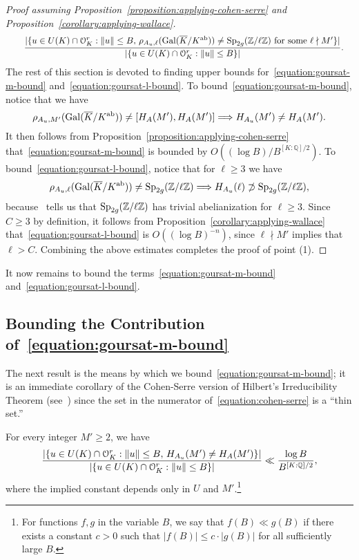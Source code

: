 \begin{proof}[Proof assuming Proposition~\ref{proposition:applying-cohen-serre} and Proposition~\ref{corollary:applying-wallace}]
\begin{align}
			& \qquad \frac{|\{ u \in U(K) \cap \mathcal O_K^r : \|u \| \leq B,\, \rho_{A_u, \ell}(\Gal(\overline K/K^{\ab})) \neq \Sp_{2g}(\mathbb Z/\ell \mathbb Z) \text{ for some } \ell \nmid M' \}|}{|\{ u \in U(K) \cap \mathcal O_K^r : \|u \| \leq B \} |} \raisetag{-0.6cm}{\label{equation:goursat-l-bound}}.
\end{align}
The rest of this section is devoted to finding upper bounds for~\eqref{equation:goursat-m-bound} and~\eqref{equation:goursat-l-bound}. To bound~\eqref{equation:goursat-m-bound}, notice that we have
$$\rho_{A_u, M'}(\operatorname{Gal}(\overline K/K^{\text{ab}})) \neq [H_A(M'), H_A(M')] \Longrightarrow H_{A_u}(M') \neq H_A(M').$$ It then follows from Proposition~\ref{proposition:applying-cohen-serre} that~\eqref{equation:goursat-m-bound} is bounded by $O( (\log B)/B^{\left[ K:\mathbb Q \right]/2} )$. To bound~\eqref{equation:goursat-l-bound}, notice that for $\ell \geq 3$ we have
$$\rho_{A_u, \ell}(\operatorname{Gal}(\overline{K}/K^{\text{ab}})) \neq \operatorname{Sp}_{2g}({\mathbb Z} / \ell \mathbb Z) \Longrightarrow H_{A_u}(\ell) \not\supset \operatorname{Sp}_{2g}({\mathbb Z} / \ell \mathbb Z) ,$$ because~\cite[Proposition 3(a)]{landesman-swaminathan-tao-xu:lifting-symplectic-group} tells us that $\operatorname{Sp}_{2g}({\mathbb Z} /\ell \mathbb Z)$ has trivial abelianization for $\ell \ge 3$. Since $C \geq 3$ by definition, it follows from Proposition~\ref{corollary:applying-wallace} that~\eqref{equation:goursat-l-bound} is $O(( \log B )^{-n} )$, since $\ell \nmid M'$ implies that $\ell > C$.
Combining the above estimates completes the proof of point (1).
\end{proof}
It now remains to bound the terms~\eqref{equation:goursat-m-bound} and~\eqref{equation:goursat-l-bound}.

\subsection{Bounding the Contribution of~\eqref{equation:goursat-m-bound}} \label{subsection:cohen-serre}

The next result is the means by which we bound~\eqref{equation:goursat-m-bound}; it is an immediate corollary of the Cohen-Serre version of Hilbert's Irreducibility Theorem (see~\cite[Theorem 1.2]{zywina2010hilbert}) since
the set in the numerator of~\eqref{equation:cohen-serre}
is a ``thin set.''


\begin{proposition} \label{proposition:applying-cohen-serre}
		For every integer $M' \ge 2$, we have
		\begin{align}
			\label{equation:cohen-serre}
			\frac{|\{u \in U(K) \cap \mathcal{O}^r_K : \lVert u \rVert \le B,\, H_{A_u}(M') \neq H_A(M') \} |}{ |\{ u\in U(K) \cap \mathcal{O}^r_K: \lVert u \rVert \le B \}| } \ll \frac{ \log B}{B^{[K:{\mathbb Q}]/2}},
		\end{align}
where the implied constant depends only in $U$ and $M'$.\footnote{For functions $f,g$ in the variable $B$, we say that $f(B) \ll g(B)$ if there exists a constant $c > 0$ such that $|f(B)| \leq c \cdot |g(B)|$ for all sufficiently large $B$.}
\end{proposition}
	
